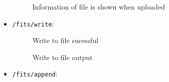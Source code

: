 \documentclass[a4paper,oneside,11pt]{book}
\begin{document}
\begin{itemize}
\begin{figure}[h]
        \caption{Information of file is shown when uploaded}
    \end{figure} 
    \clearpage
    \item \texttt{/fits/write}:
    \begin{figure}[h]
        \centering
        \caption{Write to file sucessful}
    \end{figure}
    \begin{figure}[h]
        \centering
        \caption{Write to file output}
    \end{figure}
    \clearpage
    \item \texttt{/fits/append}: 
    \begin{figure}[h]
        \centering

\end{figure}
\end{itemize}
\end{document}
